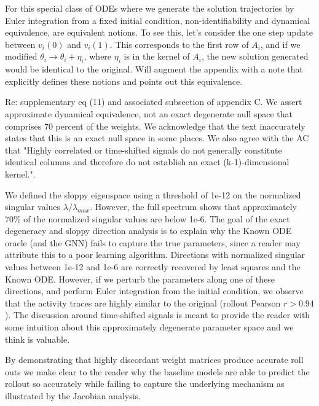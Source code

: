 \documentclass[11pt]{article}
\begin{document}

For this special class of ODEs where we generate the solution trajectories by Euler integration from a fixed initial condition, non-identifiability and dynamical equivalence, are equivalent notions. To see this, let's consider the one step update between $v_i(0)$ and $v_i(1)$. This corresponds to the first row of $A_i$, and if we modified $\theta_i \rightarrow \theta_i + \eta_i$, where $\eta_i$ is in the kernel of $A_i$, the new solution generated would be identical to the original. Will augment the appendix with a note that explicitly defines these notions and points out this equivalence.

Re: supplementary eq (11) and associated subsection of appendix C. We assert approximate dynamical equivalence, not an exact degenerate null space that comprises 70 percent of the weights. We acknowledge that the text inaccurately states that this is an exact null space in some places. We also agree with the AC that "Highly correlated or time-shifted signals do not generally constitute identical columns and therefore do not establish an exact (k-1)-dimensional kernel.".

We defined the sloppy eigenspace using a threshold of 1e-12 on the normalized singular values $\lambda/\lambda_{max}$. However, the full spectrum shows that approximately 70\% of the normalized singular values are below 1e-6. The goal of the exact degeneracy and sloppy direction analysis is to explain why the Known ODE oracle (and the GNN) fails to capture the true parameters, since a reader may attribute this to a poor learning algorithm. Directions with normalized singular values between 1e-12 and 1e-6 are correctly recovered by least squares and the Known ODE. However, if we perturb the parameters along one of these directions, and perform Euler integration from the initial condition, we observe that the activity traces are highly similar to the original (rollout Pearson $r > 0.94$). The discussion around time-shifted signals is meant to provide the reader with some intuition about this approximately degenerate parameter space and we think is valuable. 

By demonstrating that highly discordant weight matrices produce accurate roll outs we make clear to the reader why the baseline models are able to predict the rollout so accurately while failing to capture the underlying mechanism as illustrated by the Jacobian analysis.

\end{document}
